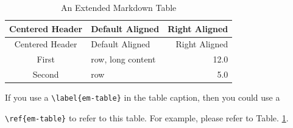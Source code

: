 \documentclass[10pt, a4paper, oneside]{article}
\begin{document}
\begin{longtable}[c]{@{}clr@{}}
\caption{An Extended Markdown Table \label{em-table}}\tabularnewline
\toprule
\begin{minipage}[b]{0.14\columnwidth}\centering\strut
Centered
Header
\strut\end{minipage} & \begin{minipage}[b]{0.11\columnwidth}\raggedright\strut
Default
Aligned
\strut\end{minipage} & \begin{minipage}[b]{0.11\columnwidth}\raggedleft\strut
Right
Aligned
\strut\end{minipage}\tabularnewline
\midrule
\endfirsthead
\toprule
\begin{minipage}[b]{0.14\columnwidth}\centering\strut
Centered
Header
\strut\end{minipage} & \begin{minipage}[b]{0.11\columnwidth}\raggedright\strut
Default
Aligned
\strut\end{minipage} & \begin{minipage}[b]{0.11\columnwidth}\raggedleft\strut
Right
Aligned
\strut\end{minipage}\tabularnewline
\midrule
\endhead
\begin{minipage}[t]{0.14\columnwidth}\centering\strut
First
\strut\end{minipage} & \begin{minipage}[t]{0.11\columnwidth}\raggedright\strut
row,
long
content
\strut\end{minipage} & \begin{minipage}[t]{0.11\columnwidth}\raggedleft\strut
12.0
\strut\end{minipage}\tabularnewline
\begin{minipage}[t]{0.14\columnwidth}\centering\strut
Second
\strut\end{minipage} & \begin{minipage}[t]{0.11\columnwidth}\raggedright\strut
row
\strut\end{minipage} & \begin{minipage}[t]{0.11\columnwidth}\raggedleft\strut
5.0
\strut\end{minipage}\tabularnewline
\bottomrule
\end{longtable}

If you use a \texttt{\textbackslash{}label\{em-table\}} in the table caption, then you could use a

\texttt{\textbackslash{}ref\{em-table\}} to refer to this table.
For example, please refer to Table. \ref{em-table}.
\end{document}
